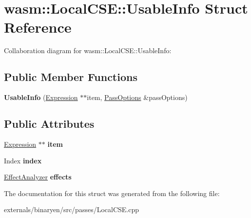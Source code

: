 \hypertarget{structwasm_1_1_local_c_s_e_1_1_usable_info}{}\section{wasm\+:\+:Local\+C\+SE\+:\+:Usable\+Info Struct Reference}
\label{structwasm_1_1_local_c_s_e_1_1_usable_info}


Collaboration diagram for wasm\+:\+:Local\+C\+SE\+:\+:Usable\+Info\+:
\subsection*{Public Member Functions}
\begin{DoxyCompactItemize}
\item 
\mbox{\label{structwasm_1_1_local_c_s_e_1_1_usable_info_a87f4cf27dfb2e4c50c19f13601ddad34}} 
{\bfseries Usable\+Info} (\mbox{\hyperlink{classwasm_1_1_expression}{Expression}} $\ast$$\ast$item, \mbox{\hyperlink{structwasm_1_1_pass_options}{Pass\+Options}} \&pass\+Options)
\end{DoxyCompactItemize}
\subsection*{Public Attributes}
\begin{DoxyCompactItemize}
\item 
\mbox{\label{structwasm_1_1_local_c_s_e_1_1_usable_info_a8410caea7b6a86374614fc9c85742c33}} 
\mbox{\hyperlink{classwasm_1_1_expression}{Expression}} $\ast$$\ast$ {\bfseries item}
\item 
\mbox{\label{structwasm_1_1_local_c_s_e_1_1_usable_info_ad043d8c4af8204a17bd65960fa6f9b23}} 
Index {\bfseries index}
\item 
\mbox{\label{structwasm_1_1_local_c_s_e_1_1_usable_info_a4c4fca3d2e61f462ae7f39104eeab488}} 
\mbox{\hyperlink{structwasm_1_1_effect_analyzer}{Effect\+Analyzer}} {\bfseries effects}
\end{DoxyCompactItemize}


The documentation for this struct was generated from the following file\+:\begin{DoxyCompactItemize}
\item 
externals/binaryen/src/passes/Local\+C\+S\+E.\+cpp\end{DoxyCompactItemize}
